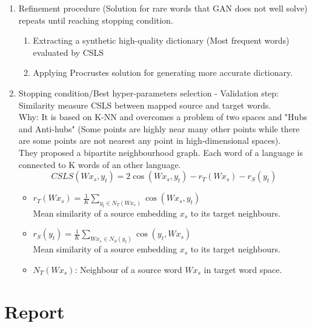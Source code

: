 \documentclass{article}
\begin{document}
\begin{enumerate}
\begin{itemize}
	
	\end{itemize}
\item Refinement procedure (Solution for rare words that GAN does not well solve) repeats until reaching stopping condition.
	\begin{enumerate}
	\item Extracting a synthetic high-quality dictionary (Most frequent words) evaluated by CSLS
	\item Applying Procrustes solution for generating more accurate dictionary.
	\end{enumerate}
\item Stopping condition/Best hyper-parameters selection - Validation step: Similarity measure CSLS between mapped source and target words.\\
	Why: It is based on K-NN and overcomes a problem of two spaces and "Hubs and Anti-hubs" (Some points are highly near many other points while there are some points are not nearest any point in high-dimensional spaces).\\
	They proposed a bipartite neighbourhood graph. Each word of a language is connected to K words of an other language.
	\begin{equation}
	CSLS(Wx_{s}, y_{t}) = 2 \cos(Wx_{s}, y_{t}) - r_{T}(Wx_{s}) - r_{S}(y_{t})
	\end{equation}
		\begin{itemize}
		\item $r_{T}(Wx_{s}) = \frac{1}{K} \sum_{y_{t} \in N_{T}(Wx_{s})} \cos(Wx_{s}, y_{t})$\\
		Mean similarity of a source embedding $x_{s}$ to its target neighbours.
		\item $r_{S}(y_{t}) = \frac{1}{K} \sum_{Wx_{s} \in N_{S}(y_{t})} \cos(y_{t}, Wx_{s})$\\
		Mean similarity of a source embedding $x_{s}$ to its target neighbours.
		\item $N_{T}(Wx_{s})$: Neighbour of a source word $Wx_{s}$ in target word space.
		\end{itemize}

\end{enumerate}


\pagebreak 
\part{Report}
\end{document}
